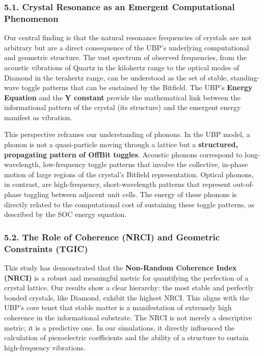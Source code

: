 \subsubsection{5.1. Crystal Resonance as an Emergent Computational
Phenomenon}\label{crystal-resonance-as-an-emergent-computational-phenomenon}

Our central finding is that the natural resonance frequencies of
crystals are not arbitrary but are a direct consequence of the UBP's
underlying computational and geometric structure. The vast spectrum of
observed frequencies, from the acoustic vibrations of Quartz in the
kilohertz range to the optical modes of Diamond in the terahertz range,
can be understood as the set of stable, standing-wave toggle patterns
that can be sustained by the Bitfield. The UBP's \textbf{Energy
Equation} and the \textbf{Y constant} provide the mathematical link
between the informational pattern of the crystal (its structure) and the
emergent energy manifest as vibration.

This perspective reframes our understanding of phonons. In the UBP
model, a phonon is not a quasi-particle moving through a lattice but a
\textbf{structured, propagating pattern of OffBit toggles}. Acoustic
phonons correspond to long-wavelength, low-frequency toggle patterns
that involve the collective, in-phase motion of large regions of the
crystal's Bitfield representation. Optical phonons, in contrast, are
high-frequency, short-wavelength patterns that represent out-of-phase
toggling between adjacent unit cells. The energy of these phonons is
directly related to the computational cost of sustaining these toggle
patterns, as described by the SOC energy equation.

\subsubsection{5.2. The Role of Coherence (NRCI) and Geometric
Constraints
(TGIC)}\label{the-role-of-coherence-nrci-and-geometric-constraints-tgic}

This study has demonstrated that the \textbf{Non-Random Coherence Index
(NRCI)} is a robust and meaningful metric for quantifying the perfection
of a crystal lattice. Our results show a clear hierarchy: the most
stable and perfectly bonded crystals, like Diamond, exhibit the highest
NRCI. This aligns with the UBP's core tenet that stable matter is a
manifestation of extremely high coherence in the informational
substrate. The NRCI is not merely a descriptive metric; it is a
predictive one. In our simulations, it directly influenced the
calculation of piezoelectric coefficients and the ability of a structure
to sustain high-frequency vibrations.


